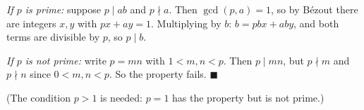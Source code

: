 \emph{If $p$ is prime:} suppose $p\mid ab$ and $p\nmid a$. Then $\gcd(p,a)=1$, so by B\'ezout there are integers $x,y$ with $px+ay=1$. Multiplying by $b$: $b=pbx+aby$, and both terms are divisible by $p$, so $p\mid b$.

\emph{If $p$ is not prime:} write $p=mn$ with $1<m,n<p$. Then $p\mid mn$, but $p\nmid m$ and $p\nmid n$ since $0<m,n<p$. So the property fails. $\blacksquare$

(The condition $p>1$ is needed: $p=1$ has the property but is not prime.)
